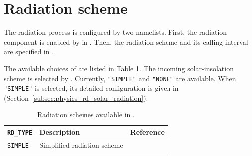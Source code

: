 \section{Radiation scheme} \label{sec:basic_usel_radiation}
The radiation process is configured by two namelists.
First, the radiation component is enabled by  in .
Then, the radiation scheme and its calling interval are specified in .


The available choices of  are listed in Table \ref{tab:rd_scheme_list}.
The incoming solar-insolation scheme is selected by .
Currently, \verb|"SIMPLE"| and \verb|"NONE"| are available.
When \verb|"SIMPLE"| is selected, its detailed configuration is given in  (Section~\ref{subsec:physics_rd_solar_radiation}).

\begin{table}[htbp]
\caption{Radiation schemes available in \scaledg.}
\label{tab:rd_scheme_list}
\begin{center}
\begin{tabularx}{150mm}{lXX}
\hline
\rowcolor[gray]{0.9}
\verb|RD_TYPE| & Description & Reference \\
\hline
\verb|SIMPLE|  & Simplified radiation scheme & \cite{Geen2016,Vallis2018} \\
\hline
\end{tabularx}
\end{center}
\end{table}

